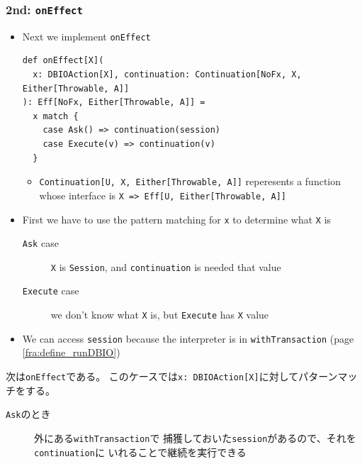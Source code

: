 \begin{frame}[fragile]
  \frametitle{2nd: \lstinline|onEffect|}

  \begin{itemize}
    \item Next we implement \lstinline|onEffect|

    \pause
\begin{lstlisting}[style=scala]
def onEffect[X](
  x: DBIOAction[X], continuation: Continuation[NoFx, X, Either[Throwable, A]]
): Eff[NoFx, Either[Throwable, A]] =
  x match {
    case Ask() => continuation(session)
    case Execute(v) => continuation(v)
  }
\end{lstlisting}

    \begin{itemize}
      \item \lstinline|Continuation[U, X, Either[Throwable, A]]| reperesents
      a function whose interface is \lstinline|X => Eff[U, Either[Throwable, A]]|
    \end{itemize}

    \pause
    \item First we have to use the pattern matching for \lstinline|x|
    to determine what \lstinline|X| is
    \begin{description}
      \item[\texttt{Ask} case] \lstinline|X| is \lstinline|Session|,
      and \lstinline|continuation| is needed that value

      \item[\texttt{Execute} case] we don't know what \lstinline|X| is,
      but \lstinline|Execute| has \lstinline|X| value
    \end{description}

    \pause
    \item We can access \lstinline|session| because
    the interpreter is in \lstinline|withTransaction| (page \ref{fra:define_runDBIO})
  \end{itemize}

  \begin{notes}
    \item 次は\lstinline|onEffect|である。
    このケースでは\lstinline|x: DBIOAction[X]|に対してパターンマッチをする。

    \item
    \begin{description}
      \item[\texttt{Ask}のとき]
      外にある\lstinline|withTransaction|で
      捕獲しておいた\lstinline|session|があるので、それを\lstinline|continuation|に
      いれることで継続を実行できる


\end{description}
\end{notes}
\end{frame}

